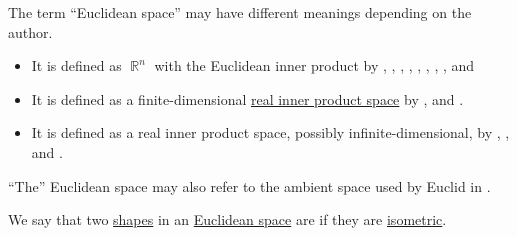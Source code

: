 \begin{remark}\label{rem:euclidean_space_etymology}
  The term \enquote{Euclidean space} may have different meanings depending on the author.
  \begin{itemize}
    \item It is defined as \( \BbbR^n \) with the Euclidean inner product by
    ,
    ,
    ,
    ,
    ,
    ,
    ,
    ,
     and

    \item It is defined as a finite-dimensional
    \hyperref[def:inner_product_space]{real inner product space} by
    ,
     and
    .

    \item It is defined as a real inner product space, possibly infinite-dimensional, by
    ,
    ,
     and
    .
  \end{itemize}

  \enquote{The} Euclidean space may also refer to the ambient space used by Euclid in \cite{Fitzpatrick2008EuclidsElements}.
\end{remark}

\begin{definition}\label{def:congruent_shapes}
  We say that two \hyperref[con:geometric_shape]{shapes} in an \hyperref[def:euclidean_space]{Euclidean space} are  if they are \hyperref[def:isometry]{isometric}.
\end{definition}

